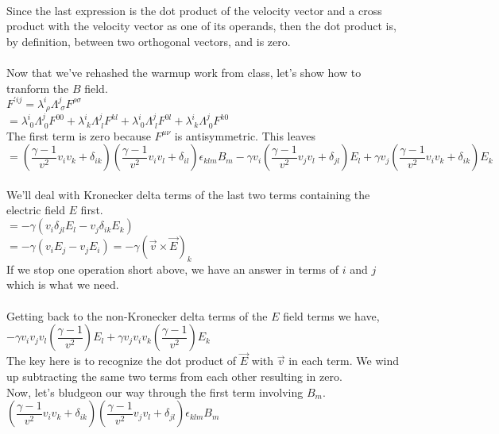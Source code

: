 \documentclass[prb,preprint]
{revtex4-1}
\begin{document}
\\
Since the last expression is the dot product of the velocity vector and a cross product with the velocity vector as one of its operands, then the dot product is, by definition, between two orthogonal vectors, and is zero.
\\
\\
Now that we've rehashed the warmup work from class, let's show how to tranform the $B$ field.
\\
$F^{\prime ij} = \lambda^i_{\;\rho} \Lambda^j_{\;\sigma}F^{\rho\sigma}$
\\
$ = \lambda^i_{\;0} \Lambda^j_{\;0} F^{00} + \lambda^i_{\;k} \Lambda^j_{\;l} F^{kl} + \lambda^i_{\;0} \Lambda^j_{\;l} F^{0l} + \lambda^i_{\;k} \Lambda^j_{\;0} F^{k0}$
\\
The first term is zero because $F^{\mu\nu}$ is antisymmetric.  This leaves
\\
$ = \left(\dfrac{\gamma - 1}{v^2} v_i v_k + \delta_{ik}\right) \left(\dfrac{\gamma - 1}{v^2} v_i v_l + \delta_{il}\right)\epsilon_{klm} B_m -\gamma v_i \left(\dfrac{\gamma - 1}{v^2} v_j v_l + \delta_{jl}\right)E_l + \gamma v_j \left(\dfrac{\gamma - 1}{v^2} v_i v_k + \delta_{ik}\right)E_k$
\\
\\
We'll deal with Kronecker delta terms of the last two terms containing the electric field $E$ first.
\\
$= -\gamma\left(v_i \delta_{jl} E_l - v_j \delta_{ik} E_k\right)$
\\
$= -\gamma\left(v_i E_j - v_j E_i\right) = -\gamma\left(\vec{v} \times \vec{E} \right)_k$
\\
If we stop one operation short above, we have an answer in terms of $i$ and $j$ which is what we need.
\\
\\
Getting back to the non-Kronecker delta terms of the $E$ field terms we have,
\\
$-\gamma v_i v_j v_l \left(\dfrac{\gamma - 1}{v^2}\right) E_l + \gamma v_j v_i v_k \left(\dfrac{\gamma - 1}{v^2}\right) E_k$
\\
The key here is to recognize the dot product of $\vec{E}$ with $\vec{v}$ in each term.  We wind up subtracting the same two terms from each other resulting in zero.
\\
Now, let's bludgeon our way through the first term involving $B_m$.
\\
$\left(\dfrac{\gamma - 1}{v^2} v_i v_k + \delta_{ik}\right) \left(\dfrac{\gamma - 1}{v^2} v_j v_l + \delta_{jl}\right)\epsilon_{klm} B_m $
\end{document}
